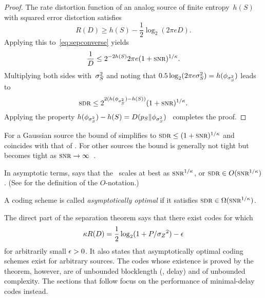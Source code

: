 \begin{proof}
  The rate distortion function of an analog source of finite entropy~$h(S)$
  with squared error distortion satisfies~\cite{Shannon1959}
  \begin{equation*}
    R(D) \ge h(S) - \frac12 \log_2(2\pi e D).
  \end{equation*}
  Applying this to~\eqref{eq:sepconverse} yields
  \begin{equation*}
    \frac1D \le 2^{-2h(S)} 2\pi e (1 + \snr)^{1/\k}.
  \end{equation*}
  Multiplying both sides with~${\sigma_S^2}$ and noting that $0.5 \log_2(2\pi e {\sigma_S^2}) =
  h(\phi_{{\sigma_S^2}})$ leads to
  \begin{equation*}
    \sdr \le 2^{2(h(\phi_{\ssq}) - h(S))} (1 + \snr)^{1/\k}.
  \end{equation*}
  Applying the property $h(\phi_{{\sigma_S^2}}) - h(S) = D({p_S} \|
  \phi_{{\sigma_S^2}})$~\cite[Theorem~8.6.5]{CoverT1991} completes the proof.
\end{proof}

\begin{remark}
  \label{rem:perflimitgaussiansource}
  For a Gaussian source the bound of  simplifies to $\sdr \le (1 +
  \snr)^{1/\k}$ and coincides with that of . For other
  sources the bound is generally not tight but becomes tight as $\snr \ra
  \infty$~\cite{LinderZ1994}.
\end{remark}

\begin{remark}
  \label{rem:asympbound}
  In asymptotic terms,  says that the \sdr\ scales at best as
  $\snr^{1/\k}$, or $\sdr \in O(\snr^{1/\k})$. (See  for the
  definition of the $O$-notation.)
\end{remark}

\begin{definition}
  A coding scheme is called \emph{asymptotically optimal} if it satisfies $\sdr
  \in \Omega(\snr^{1/\k})$.
\end{definition}

The direct part of the separation theorem says that there exist codes for
which 
\begin{equation*}
  \kappa R(D) = \frac12 \log_2(1 + P/{{\sigma_Z}^2}) - \epsilon
\end{equation*}
for arbitrarily small $\epsilon > 0$. It also states that asymptotically optimal
coding schemes exist for arbitrary sources. The codes whose existence is proved
by the theorem, however, are of unbounded blocklength (\ie, delay) and of
unbounded complexity. The sections that follow focus on the performance of
minimal-delay codes instead.


